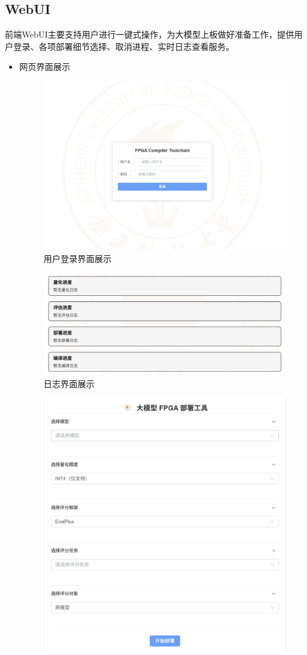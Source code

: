 \documentclass[AutoFakeBold,AutoFakeSlant,language=chinese,degree=bachelor]{sustechthesis}
\begin{document}
\subsection{WebUI}
前端WebUI主要支持用户进行一键式操作，为大模型上板做好准备工作，提供用户登录、各项部署细节选择、取消进程、实时日志查看服务。
\begin{itemize}
    \item 网页界面展示
        \begin{figure}[H]
            \centering
            \includegraphics[width=.64\textwidth]{./figures/login_display.png}
            \caption{用户登录界面展示}
        \end{figure}
        \begin{figure}[H]
            \centering
            \includegraphics[width=.64\textwidth]{./figures/log_display.png}
            \caption{日志界面展示}
        \end{figure}
        \begin{figure}[H]
            \centering
            \includegraphics[width=.64\textwidth]{./figures/deploymenttool_display.png}

\end{figure}
\end{itemize}
\end{document}
